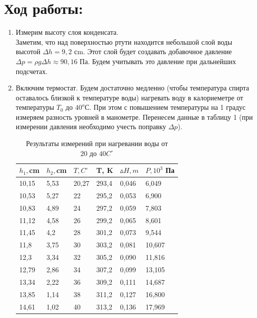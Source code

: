 \documentclass[a4paper, 12pt]{article}
\theoremstyle{plain} %
\theoremstyle{definition} %
\theoremstyle{remark} %
\begin{document}
\section{Ход работы:}
\begin{enumerate}
\item
Измерим высоту слоя конденсата.\\	
Заметим, что над поверхностью ртути находится небольшой слой воды высотой $\Delta h = 9,2$ сm. Этот слой будет создавать добавочное давление $\Delta p = \rho g \Delta h \approx  90,16$ Па. Будем учитывать это давление при дальнейших подсчетах.
\item
Включим термостат. Будем достаточно медленно (чтобы температура спирта оставалось близкой к температуре воды) нагревать воду в калориеметре от температуры $T_0$ до $40^o$С. При этом с повышением температуры на 1 градус измеряем разность уровней в манометре. Перенесем данные в таблицу 1 (при измерении давления необходимо учесть поправку $\Delta p$). 

\begin{table}[h]

\begin{center}
\label{my-label}
\begin{tabular}{|l|l|l|l|l|l|}
\hline
\textbf{$h_1, $cm} &\textbf{$h_2, $cm} & \textbf{$T, C^{\circ}$} & \textbf{T, K}  & \textbf{$\vartriangle H, m$} & \textbf{$P, 10^3 $ Па} \\ \hline
10,15  & 5,53   & 20,27        & 293,4 & 0,046       & 6,049                      \\
10,53  & 5,27   & 22           & 295,2 & 0,053       & 6,900                      \\
10,83  & 4,89   & 24           & 297,2 & 0,059       & 7,803                      \\
11,12  & 4,58   & 26           & 299,2 & 0,065       & 8,601                      \\
11,45  & 4,2    & 28           & 301,2 & 0,073       & 9,544                      \\
11,8   & 3,75   & 30           & 303,2 & 0,081       & 10,607                     \\
12,3   & 3,34   & 32           & 305,2 & 0,090       & 11,816                     \\
12,79  & 2,86   & 34           & 307,2 & 0,099       & 13,105                     \\
13,34  & 2,22   & 36           & 309,2 & 0,111       & 14,687                     \\
13,85  & 1,14   & 38           & 311,2 & 0,127       & 16,800                     \\
14,61  & 1,02   & 40           & 313,2 & 0,136       & 17,969                     \\ \hline
\end{tabular}
\caption{Результаты измерений при нагревании воды от $20 \text{ до } 40 C^{\circ}$}
\end{center}
\end{table}


\end{enumerate}
\end{document}

